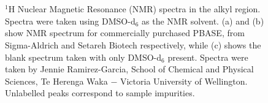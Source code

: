 \documentclass[
  a4paper,
]{scrbook}
\begin{document}
\begin{figure}
\begin{minipage}[t]{0.03\linewidth}
{\centering 


}

\end{minipage}%
%
\begin{minipage}[t]{0.01\linewidth}

{\centering 

~

}

\end{minipage}%
%
\begin{minipage}[t]{0.92\linewidth}

{\centering 


}

\end{minipage}%
%
\begin{minipage}[t]{0.04\linewidth}

{\centering 

~

}

\end{minipage}%

\caption[\(^{1}\)H Nuclear Magnetic Resonance (NMR) spectra of
commercially purchased PBASE in the alkyl region, using DMSO-d\(_6\) as
the NMR solvent.]{\label{fig-pbase-nmr}\(^{1}\)H Nuclear Magnetic
Resonance (NMR) spectra in the alkyl region. Spectra were taken using
DMSO-d\(_6\) as the NMR solvent. (a) and (b) show NMR spectrum for
commercially purchased PBASE, from Sigma-Aldrich and Setareh Biotech
respectively, while (c) shows the blank spectrum taken with only
DMSO-d\(_6\) present. Spectra were taken by Jennie Ramirez-Garcia,
School of Chemical and Physical Sciences, Te Herenga Waka \(-\) Victoria
University of Wellington. Unlabelled peaks correspond to sample
impurities.}

\end{figure}
\end{document}
